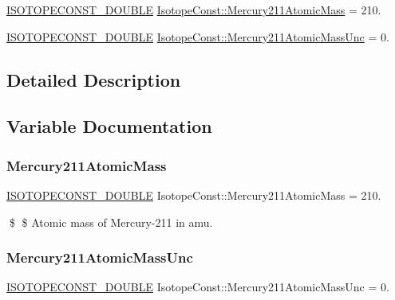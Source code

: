 \begin{DoxyCompactItemize}
\item 
\mbox{\hyperlink{group___isotope_const-_macros_ga8f45a7272ce02c0b4c65c44636ed719a}{I\+S\+O\+T\+O\+P\+E\+C\+O\+N\+S\+T\+\_\+\+D\+O\+U\+B\+LE}} \mbox{\hyperlink{group___isotope_const-_mercury-_hg211_ga9be906291767debb6e276a698dcfa999}{Isotope\+Const\+::\+Mercury211\+Atomic\+Mass}} = 210.
\item 
\mbox{\hyperlink{group___isotope_const-_macros_ga8f45a7272ce02c0b4c65c44636ed719a}{I\+S\+O\+T\+O\+P\+E\+C\+O\+N\+S\+T\+\_\+\+D\+O\+U\+B\+LE}} \mbox{\hyperlink{group___isotope_const-_mercury-_hg211_ga72c129ee1c47032747e5d5ac79440d26}{Isotope\+Const\+::\+Mercury211\+Atomic\+Mass\+Unc}} = 0.
\end{DoxyCompactItemize}


\subsection{Detailed Description}


\subsection{Variable Documentation}
\mbox{\label{group___isotope_const-_mercury-_hg211_ga9be906291767debb6e276a698dcfa999}} 
\subsubsection{\texorpdfstring{Mercury211\+Atomic\+Mass}{Mercury211AtomicMass}}
{\footnotesize\ttfamily \mbox{\hyperlink{group___isotope_const-_macros_ga8f45a7272ce02c0b4c65c44636ed719a}{I\+S\+O\+T\+O\+P\+E\+C\+O\+N\+S\+T\+\_\+\+D\+O\+U\+B\+LE}} Isotope\+Const\+::\+Mercury211\+Atomic\+Mass = 210.}

\$ \$ Atomic mass of Mercury-\/211 in amu. \mbox{\label{group___isotope_const-_mercury-_hg211_ga72c129ee1c47032747e5d5ac79440d26}} 
\subsubsection{\texorpdfstring{Mercury211\+Atomic\+Mass\+Unc}{Mercury211AtomicMassUnc}}
{\footnotesize\ttfamily \mbox{\hyperlink{group___isotope_const-_macros_ga8f45a7272ce02c0b4c65c44636ed719a}{I\+S\+O\+T\+O\+P\+E\+C\+O\+N\+S\+T\+\_\+\+D\+O\+U\+B\+LE}} Isotope\+Const\+::\+Mercury211\+Atomic\+Mass\+Unc = 0.}

